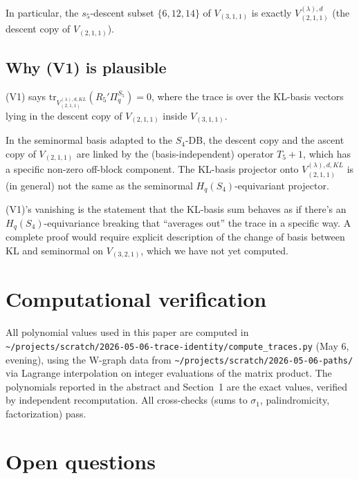 \documentclass[11pt]{article}
\theoremstyle{definition}
\begin{document}
In particular, the $s_5$-descent subset $\{6, 12, 14\}$ of $V_{(3,1,1)}$ is exactly
$V_{(2,1,1)}^{(\lambda),d}$ (the descent copy of $V_{(2,1,1)}$).

\subsection*{Why (V1) is plausible}

(V1) says $\mathrm{tr}_{V_{(2,1,1)}^{(\lambda), d, KL}}(R_5'\Pi_q^{S_5}) = 0$, where the trace is over the
KL-basis vectors lying in the descent copy of $V_{(2,1,1)}$ inside $V_{(3,1,1)}$.

In the seminormal basis adapted to the $S_4$-DB, the descent copy and the ascent copy
of $V_{(2,1,1)}$ are linked by the (basis-independent) operator $T_5+1$, which has a
specific non-zero off-block component. The KL-basis projector onto $V_{(2,1,1)}^{(\lambda),d, KL}$ is (in
general) not the same as the seminormal $H_q(S_4)$-equivariant projector.

(V1)'s vanishing is the statement that the KL-basis sum behaves as if there's an
$H_q(S_4)$-equivariance breaking that ``averages out'' the trace in a specific way.
A complete proof would require explicit description of the change of basis between
KL and seminormal on $V_{(3,2,1)}$, which we have not yet computed.

\section{Computational verification}

All polynomial values used in this paper are computed in
\texttt{\textasciitilde/projects/scratch/2026-05-06-trace-identity/compute\_traces.py}
(May 6, evening), using the W-graph data from
\texttt{\textasciitilde/projects/scratch/2026-05-06-paths/} via Lagrange
interpolation on integer evaluations of the matrix product.
The polynomials reported in the abstract and Section~1 are the exact values, verified
by independent recomputation. All cross-checks (sums to $\sigma_1$, palindromicity,
factorization) pass.

\section{Open questions}
\end{document}
